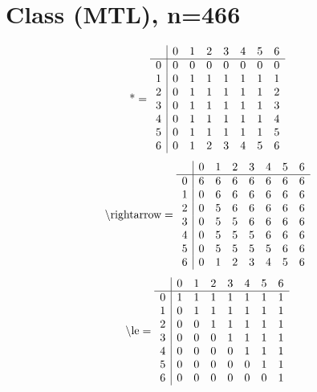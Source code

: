 \documentclass[11pt]{article}
\begin{document}
\section{Class (MTL), n=466}
\[\text{*} = 
\begin{array}{r | r r r r r r r}
 & 0 & 1 & 2 & 3 & 4 & 5 & 6 \\ \hline
0 & 0 & 0 & 0 & 0 & 0 & 0 & 0 \\
1 & 0 & 1 & 1 & 1 & 1 & 1 & 1 \\
2 & 0 & 1 & 1 & 1 & 1 & 1 & 2 \\
3 & 0 & 1 & 1 & 1 & 1 & 1 & 3 \\
4 & 0 & 1 & 1 & 1 & 1 & 1 & 4 \\
5 & 0 & 1 & 1 & 1 & 1 & 1 & 5 \\
6 & 0 & 1 & 2 & 3 & 4 & 5 & 6 \\
\end{array}
\]
\[\text{\textbackslash rightarrow} = 
\begin{array}{r | r r r r r r r}
 & 0 & 1 & 2 & 3 & 4 & 5 & 6 \\ \hline
0 & 6 & 6 & 6 & 6 & 6 & 6 & 6 \\
1 & 0 & 6 & 6 & 6 & 6 & 6 & 6 \\
2 & 0 & 5 & 6 & 6 & 6 & 6 & 6 \\
3 & 0 & 5 & 5 & 6 & 6 & 6 & 6 \\
4 & 0 & 5 & 5 & 5 & 6 & 6 & 6 \\
5 & 0 & 5 & 5 & 5 & 5 & 6 & 6 \\
6 & 0 & 1 & 2 & 3 & 4 & 5 & 6 \\
\end{array}
\]
\[\text{\textbackslash le} = 
\begin{array}{r | r r r r r r r}
 & 0 & 1 & 2 & 3 & 4 & 5 & 6 \\ \hline
0 & 1 & 1 & 1 & 1 & 1 & 1 & 1 \\
1 & 0 & 1 & 1 & 1 & 1 & 1 & 1 \\
2 & 0 & 0 & 1 & 1 & 1 & 1 & 1 \\
3 & 0 & 0 & 0 & 1 & 1 & 1 & 1 \\
4 & 0 & 0 & 0 & 0 & 1 & 1 & 1 \\
5 & 0 & 0 & 0 & 0 & 0 & 1 & 1 \\
6 & 0 & 0 & 0 & 0 & 0 & 0 & 1 \\
\end{array}
\]
\end{document}
